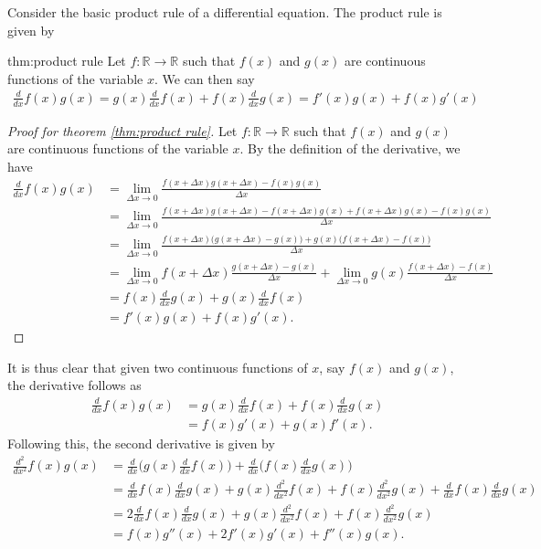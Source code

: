 Consider the basic product rule of a differential equation. The product rule is given by
\begin{theo}{thm:product rule}
	Let $f:\mathbb{R}\rightarrow\mathbb{R}$ such that $f(x)$ and $g(x)$ are continuous functions of the variable $x$. We can then say
	\begin{align*}
		\frac{d}{dx}f(x)g(x)=g(x)\frac{d}{dx}f(x)+f(x)\frac{d}{dx}g(x)=f'(x)g(x)+f(x)g'(x)
	\end{align*}
\end{theo}
\begin{proof}[Proof for theorem \ref{thm:product rule}]
	Let $f:\mathbb{R}\rightarrow\mathbb{R}$ such that $f(x)$ and $g(x)$ are continuous functions of the variable $x$. By the definition of the derivative, we have
	\begin{align*}
		\frac{d}{dx}f(x)g(x)&=\lim\limits_{\Delta x \rightarrow 0}\frac{f(x+\Delta x)g(x+\Delta x)-f(x)g(x)}{\Delta x} \\
		&=\lim\limits_{\Delta x \rightarrow 0}\frac{f(x+\Delta x)g(x+\Delta x)-f(x+\Delta x)g(x)+f(x+\Delta x)g(x)-f(x)g(x)}{\Delta x} \\
		&=\lim\limits_{\Delta x \rightarrow 0}\frac{f(x+\Delta x)\big(g(x+\Delta x)-g(x)\big)+g(x)\big(f(x+\Delta x)-f(x)\big)}{\Delta x} \\
		&=\lim\limits_{\Delta x \rightarrow 0}f(x+\Delta x)\frac{g(x+\Delta x)-g(x)}{\Delta x}+\lim\limits_{\Delta x \rightarrow 0}g(x)\frac{f(x+\Delta x)-f(x)}{\Delta x} \\
		&=f(x)\frac{d}{dx}g(x)+g(x)\frac{d}{dx}f(x) \\&=f'(x)g(x)+f(x)g'(x).
	\end{align*}
\end{proof}
It is thus clear that given two continuous functions of $x$, say $f(x)$ and $g(x)$, the derivative follows as
\begin{align}
	\frac{d}{dx}f(x)g(x) &= g(x)\frac{d}{dx}f(x)+f(x)\frac{d}{dx}g(x) \\
 		             &= f(x)g'(x)+g(x)f'(x). \label{product_rule_n1}
\end{align}
Following this, the second derivative is given by
\begin{align}
	\frac{d^2}{dx^2}f(x)g(x)&=\frac{d}{dx}\bigg(g(x)\frac{d}{dx}f(x)\bigg)+\frac{d}{dx}\bigg(f(x)\frac{d}{dx}g(x)\bigg) \\
	&=\frac{d}{dx}f(x)\frac{d}{dx}g(x)+g(x)\frac{d^2}{dx^2}f(x)+f(x)\frac{d^2}{dx^2}g(x)+\frac{d}{dx}f(x)\frac{d}{dx}g(x) \\
	&=2\frac{d}{dx}f(x)\frac{d}{dx}g(x)+g(x)\frac{d^2}{dx^2}f(x)+f(x)\frac{d^2}{dx^2}g(x) \\
	&= f(x)g''(x)+2f'(x)g'(x)+f''(x)g(x). \label{product_rule_n2}
\end{align}
